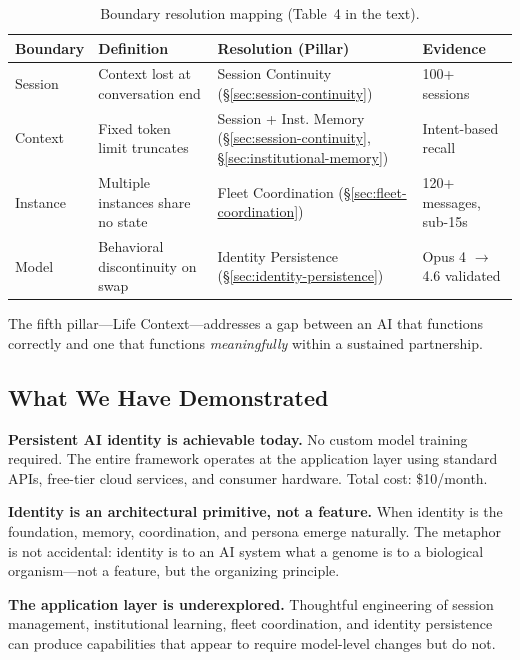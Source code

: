 \documentclass[11pt,a4paper]{article}
\begin{document}
\begin{table}[htbp]
\centering
\caption{Boundary resolution mapping (Table~4 in the text).}
\label{tab:boundary-resolution}
\small
\begin{tabularx}{\textwidth}{@{}llXl@{}}
\toprule
\textbf{Boundary} & \textbf{Definition} & \textbf{Resolution (Pillar)} & \textbf{Evidence} \\
\midrule
Session  & Context lost at conversation end & Session Continuity (\S\ref{sec:session-continuity}) & 100+ sessions \\
Context  & Fixed token limit truncates & Session + Inst. Memory (\S\ref{sec:session-continuity}, \S\ref{sec:institutional-memory}) & Intent-based recall \\
Instance & Multiple instances share no state & Fleet Coordination (\S\ref{sec:fleet-coordination}) & 120+ messages, sub-15s \\
Model    & Behavioral discontinuity on swap & Identity Persistence (\S\ref{sec:identity-persistence}) & Opus 4 $\to$ 4.6 validated \\
\bottomrule
\end{tabularx}
\end{table}

The fifth pillar---Life Context---addresses a gap between an AI that functions correctly and one that functions \emph{meaningfully} within a sustained partnership.


\subsection{What We Have Demonstrated}

\textbf{Persistent AI identity is achievable today.} No custom model training required. The entire framework operates at the application layer using standard APIs, free-tier cloud services, and consumer hardware. Total cost: \$10/month.

\textbf{Identity is an architectural primitive, not a feature.} When identity is the foundation, memory, coordination, and persona emerge naturally. The metaphor is not accidental: identity is to an AI system what a genome is to a biological organism---not a feature, but the organizing principle.

\textbf{The application layer is underexplored.} Thoughtful engineering of session management, institutional learning, fleet coordination, and identity persistence can produce capabilities that appear to require model-level changes but do not.
\end{document}
